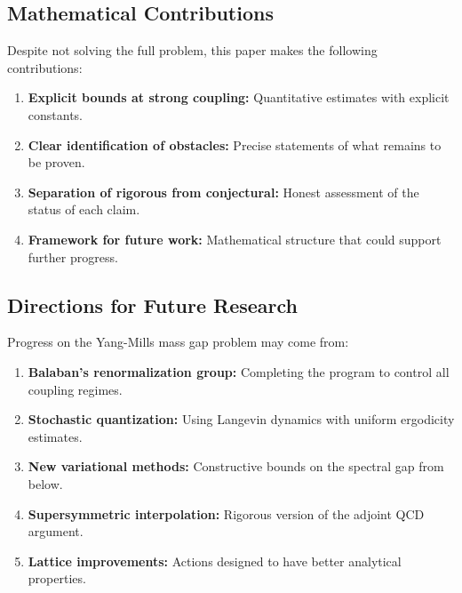 \subsection{Mathematical Contributions}

Despite not solving the full problem, this paper makes the following contributions:

\begin{enumerate}
    \item \textbf{Explicit bounds at strong coupling:} Quantitative estimates with explicit constants.
    
    \item \textbf{Clear identification of obstacles:} Precise statements of what remains to be proven.
    
    \item \textbf{Separation of rigorous from conjectural:} Honest assessment of the status of each claim.
    
    \item \textbf{Framework for future work:} Mathematical structure that could support further progress.
\end{enumerate}

\subsection{Directions for Future Research}

Progress on the Yang-Mills mass gap problem may come from:

\begin{enumerate}
    \item \textbf{Balaban's renormalization group:} Completing the program to control all coupling regimes.
    
    \item \textbf{Stochastic quantization:} Using Langevin dynamics with uniform ergodicity estimates.
    
    \item \textbf{New variational methods:} Constructive bounds on the spectral gap from below.
    
    \item \textbf{Supersymmetric interpolation:} Rigorous version of the adjoint QCD argument.
    
    \item \textbf{Lattice improvements:} Actions designed to have better analytical properties.
\end{enumerate}


